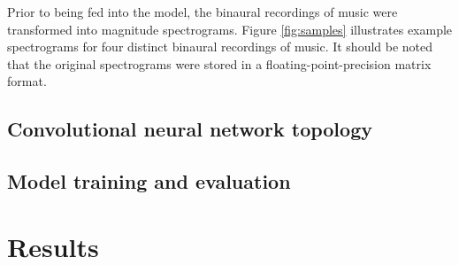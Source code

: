 \documentclass{article}
\begin{document}
Prior to being fed into the model, the binaural recordings of music were transformed into magnitude spectrograms. Figure \ref{fig:samples} illustrates example spectrograms for four distinct binaural recordings of music. It should be noted that the original spectrograms were stored in a floating-point-precision matrix format.

\subsection{Convolutional neural network topology}
\subsection{Model training and evaluation}
\section{Results}
\end{document}
